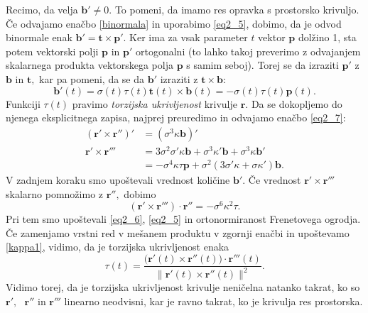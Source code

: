 \documentclass[12pt,a4paper,twoside]{article}
\theoremstyle{definition} %
\theoremstyle{plain} %
\theoremstyle{primerstyle}
\numberwithin{equation}{section}  %
\newcommand{\tV}{\mathbf{t}}
\newcommand{\bV}{\mathbf{b}}
\newcommand{\pV}{\mathbf{p}}
\newcommand{\rV}{\mathbf{r}}
\begin{document}
Recimo, da velja $\bV' \neq 0.$ To pomeni, da imamo res opravka s prostorsko krivuljo. Če odvajamo enačbo \eqref{binormala} in uporabimo \eqref{eq2_5}, dobimo, da je odvod binormale enak $\bV'=\tV \times \pV'.$ Ker ima za vsak parameter $t$ vektor $\pV$ dolžino 1, sta potem vektorski polji $\pV$ in $\pV'$ ortogonalni (to lahko takoj preverimo z odvajanjem skalarnega produkta vektorskega polja $\pV$ s samim seboj). Torej se da izraziti $\pV'$ z $\bV$ in $\tV,$ kar pa pomeni, da se da $\bV'$ izraziti z $\tV \times \bV:$
\begin{equation}
	\label{eq2_11}
	\bV'(t)=\sigma(t)\tau(t)\tV(t)\times \bV(t)=-\sigma(t)\tau(t)\pV(t).
\end{equation}
Funkciji $\tau(t)$ pravimo \textit{torzijska ukrivljenost} krivulje $\rV.$ Da se dokopljemo do njenega eksplicitnega zapisa, najprej preuredimo in odvajamo enačbo \eqref{eq2_7}:
\begin{align*}
	(\rV' \times \rV'')'&=(\sigma^3\kappa \bV)'\\
	\rV' \times \rV''' &= 3\sigma^2\sigma'\kappa\bV+\sigma^3\kappa'\bV+\sigma^3\kappa\bV'\\
	&=-\sigma^4\kappa\tau\pV+\sigma^2(3\sigma'\kappa+\sigma\kappa')\bV.
\end{align*}
V zadnjem koraku smo upoštevali vrednost količine $\bV'.$ Če vrednost $\rV'\times \rV'''$ skalarno pomnožimo z $\rV'',$ dobimo
\begin{equation}
	(\rV'\times\rV''')\cdot\rV''=-\sigma^6\kappa^2\tau.
\end{equation}
Pri tem smo upoštevali \eqref{eq2_6}, \eqref{eq2_5} in ortonormiranost Frenetovega ogrodja. Če zamenjamo vrstni red v mešanem produktu v zgornji enačbi in upoštevamo \eqref{kappa1}, vidimo, da je torzijska ukrivljenost enaka
\begin{equation}
	\label{tau1}
	\tau(t)=\frac{\big(\rV'(t)\times\rV''(t)\big)\cdot\rV'''(t)}{\lVert \rV'(t)\times \rV''(t) \rVert^2}.
\end{equation}
Vidimo torej, da je torzijska ukrivljenost krivulje neničelna natanko takrat, ko so $\rV', \text{ } \rV''$ in $\rV'''$ linearno neodvisni, kar je ravno takrat, ko je krivulja res prostorska.
\end{document}
